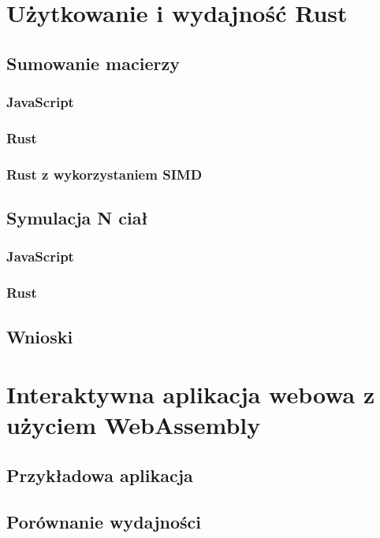 \documentclass[language=polish,type=master]{aghmodern}
\begin{document}
\chapter{Użytkowanie i wydajność Rust}

\section{Sumowanie macierzy}

\subsection{JavaScript}

\subsection{Rust}

\subsection{Rust z wykorzystaniem SIMD}

\section{Symulacja N ciał}

\subsection{JavaScript}

\subsection{Rust}

\section{Wnioski}

\chapter{Interaktywna aplikacja webowa z użyciem WebAssembly}

\section{Przykładowa aplikacja}

\section{Porównanie wydajności}
\end{document}
